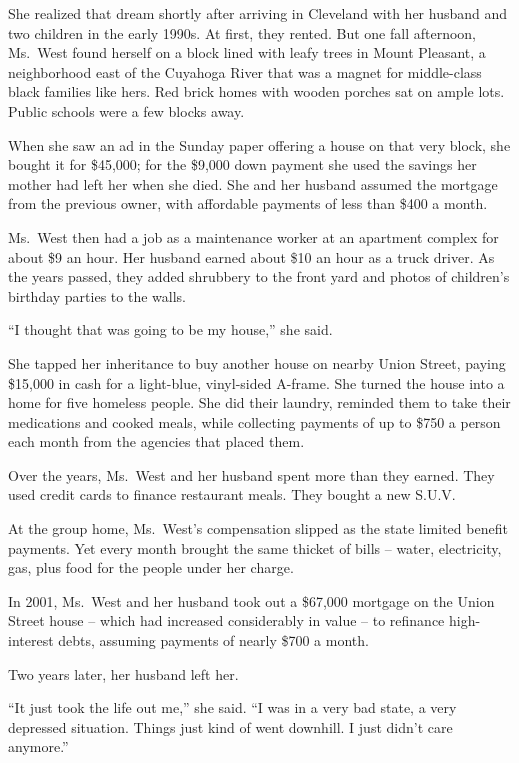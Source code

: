 ﻿\documentclass[12pt]{article}
\begin{document}
She realized that dream shortly after arriving in Cleveland with her husband and two children in the
early 1990s. At first, they rented. But one fall afternoon, Ms.~West found herself on a block lined
with leafy trees in Mount Pleasant, a neighborhood east of the Cuyahoga River that was a magnet for
middle-class black families like hers. Red brick homes with wooden porches sat on ample lots. Public
schools were a few blocks away.

When she saw an ad in the Sunday paper offering a house on that very block, she bought it for
\$45,000; for the \$9,000 down payment she used the savings her mother had left her when she died.
She and her husband assumed the mortgage from the previous owner, with affordable payments of less
than \$400 a month.

Ms.~West then had a job as a maintenance worker at an apartment complex for about \$9 an hour. Her
husband earned about \$10 an hour as a truck driver. As the years passed, they added shrubbery to
the front yard and photos of children's birthday parties to the walls.

``I thought that was going to be my house,'' she said.

She tapped her inheritance to buy another house on nearby Union Street, paying \$15,000 in cash for
a light-blue, vinyl-sided A-frame. She turned the house into a home for five homeless people. She
did their laundry, reminded them to take their medications and cooked meals, while collecting
payments of up to \$750 a person each month from the agencies that placed them.

Over the years, Ms.~West and her husband spent more than they earned. They used credit cards to
finance restaurant meals. They bought a new S.U.V.

At the group home, Ms.~West's compensation slipped as the state limited benefit payments. Yet every
month brought the same thicket of bills -- water, electricity, gas, plus food for the people under
her charge.

In 2001, Ms.~West and her husband took out a \$67,000 mortgage on the Union Street house -- which
had increased considerably in value -- to refinance high-interest debts, assuming payments of nearly
\$700 a month.

Two years later, her husband left her.

``It just took the life out me,'' she said. ``I was in a very bad state, a very depressed situation.
Things just kind of went downhill. I just didn't care anymore.''
\end{document}

